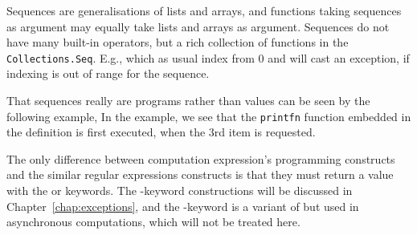 Sequences are generalisations of lists and arrays, and functions taking sequences as argument may equally take lists and arrays as argument. Sequences do not have many built-in operators, but a rich collection of functions in the \lstinline!Collections.Seq!. E.g.,
%
%
which as usual index from 0 and will cast an exception, if indexing is out of range for the sequence. 

That sequences really are programs rather than values can be seen by the following example,
%
%
In the example, we see that the \lstinline!printfn! function embedded in the definition is first executed, when the 3rd item is requested.


The only difference between computation expression's programming constructs and the similar regular expressions constructs is that they must return a value with the  or  keywords. The -keyword constructions will be discussed in Chapter~\ref{chap:exceptions}, and the -keyword is a variant of  but used in asynchronous computations, which will not be treated here.


